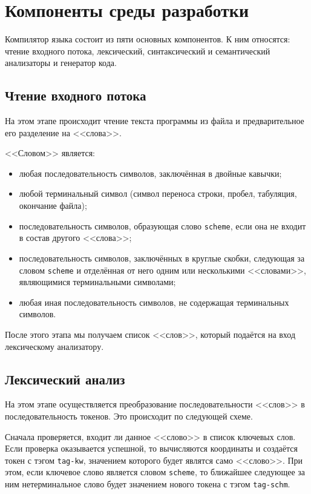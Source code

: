 \section{Компоненты среды разработки}
    Компилятор языка состоит из пяти основных компонентов.
    К ним относятся: чтение входного потока, лексический, синтаксический и семантический анализаторы и генератор кода.
    \subsection{Чтение входного потока}
    На этом этапе происходит чтение текста программы из файла и предварительное его разделение на <<слова>>.

    <<Словом>> является:
    \begin{itemize}
        \item любая последовательность символов, заключённая в двойные кавычки;
        \item любой терминальный символ (символ переноса строки, пробел, табуляция, окончание файла);
        \item последовательность символов, образующая слово \verb$scheme$, если она не входит в состав другого <<слова>>;
        \item последовательность символов, заключённых в круглые скобки, следующая за словом \verb$scheme$ и отделённая от него одним или несколькими <<словами>>, являющимися терминальными символами;
        \item любая иная последовательность символов, не содержащая терминальных символов.
    \end{itemize}

    После этого этапа мы получаем список <<слов>>, который подаётся на вход лексическому анализатору.
    
    \subsection{Лексический анализ}
    На этом этапе осуществляется преобразование последовательности <<слов>> в последовательность токенов.
    Это происходит по следующей схеме.

    Сначала проверяется, входит ли данное <<слово>> в список ключевых слов.
    Если проверка оказывается успешной, то вычисляются координаты и создаётся токен с тэгом \verb$tag-kw$, значением которого будет являтся само <<слово>>.
    При этом, если ключевое слово является словом \verb$scheme$, то ближайшее следующее за ним нетерминальное слово будет значением нового токена с тэгом \verb$tag-schm$.

